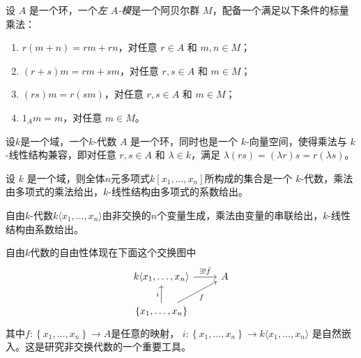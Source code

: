 \documentclass[12pt,a4paper]{ctexrep}   %
\begin{document}
\begin{definition}
    设 $A$ 是一个环，一个\emph{左 $A$-模}是一个阿贝尔群 $M$，配备一个满足以下条件的标量乘法：
    \begin{enumerate}[label=(\roman*)]
        \item $r(m+n)=rm+rn$，对任意 $r\in A$ 和 $m,n\in M$；
        \item $(r+s)m=rm+sm$，对任意 $r,s\in A$ 和 $m\in M$；
        \item $(rs)m=r(sm)$，对任意 $r,s\in A$ 和 $m\in M$；
        \item $1_A m=m$，对任意 $m\in M$。
    \end{enumerate}
\end{definition}
\begin{definition}
    设$k$是一个域，一个$k$-代数 $A$ 是一个环，同时也是一个 $k$-向量空间，使得乘法与 $k$-线性结构兼容，即对任意 $r,s\in A$ 和 $\lambda\in k$，满足 $\lambda(rs)=(\lambda r)s=r(\lambda s)$。
\end{definition}
\begin{example}
    设 $k$ 是一个域，则全体$n$元多项式$k[x_1,\ldots,x_n]$所构成的集合是一个 $k$-代数，乘法由多项式的乘法给出，$k$-线性结构由多项式的系数给出。
\end{example}

\begin{example}
    自由$k$-代数$k\langle x_1,\ldots,x_n\rangle$由非交换的$n$个变量生成，乘法由变量的串联给出，$k$-线性结构由系数给出。
\end{example}
\begin{remark}
    自由$k$代数的自由性体现在下面这个交换图中
    \begin{equation*}
        \begin{tikzcd}
            k\langle x_1,\ldots,x_n\rangle \arrow[r,"\exists!\bar{f}"] & A \\
            \{x_1,\ldots,x_n\} \arrow[u, "i"] \arrow[ur, "f"']
        \end{tikzcd}
    \end{equation*}
    其中$f:\left\{x_1,\ldots,x_n\right\}\to A$是任意的映射， $i:\left\{x_1,\ldots,x_n\right\}\rightarrow k\langle x_1,\ldots,x_n\rangle$ 是自然嵌入。这是研究非交换代数的一个重要工具。
\end{remark}
\end{document}
